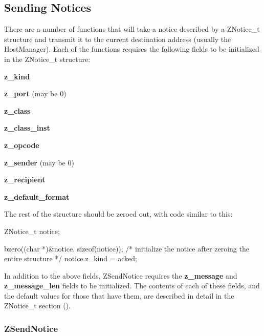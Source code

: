 %
\subsection{Sending Notices}
\label{sending-notices}

There are a number of functions that will take a notice described by a
ZNotice_t structure and transmit it to the current destination
address (usually the HostManager).  Each of the functions requires the
following fields to be initialized in the ZNotice_t structure:
\begin{list}{}{}
\item {\bf z_kind}
\item {\bf z_port} (may be 0)
\item {\bf z_class}
\item {\bf z_class_inst}
\item {\bf z_opcode}
\item {\bf z_sender} (may be 0)
\item {\bf z_recipient}
\item {\bf z_default_format}
\end{list}
The rest of the structure should be zeroed out, with code similar to
this:
\begin{code}
        ZNotice_t notice;

        bzero((char *)&notice, sizeof(notice));
        /* initialize the notice after zeroing the entire structure */
        notice.z_kind = acked;
\end{code}

In addition to the above fields, ZSendNotice requires the {\bf
z_message} and {\bf z_message_len} fields to be initialized.  The
contents of each of these fields, and the default values for those that
have them, are described in detail in the ZNotice_t section
().

\subsubsection{ZSendNotice}
\label{ZSendNotice}

\etemplate
{}

